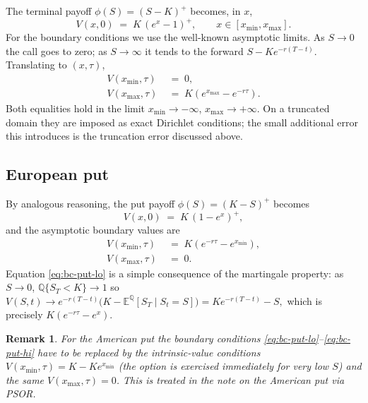 \documentclass[11pt,a4paper]{article}
\newtheorem{remark}[proposition]{Remark}
\begin{document}
The terminal payoff $\phi(S) = (S-K)^+$ becomes, in $x$,
\begin{equation}
V(x, 0) \;=\; K\,(e^x - 1)^+,
\qquad x \in [x_{\min}, x_{\max}].
\label{eq:ic-call}
\end{equation}
For the boundary conditions we use the well-known asymptotic limits.
As $S \to 0$ the call goes to zero; as $S \to \infty$ it tends to the
forward $S - K e^{-r(T-t)}$. Translating to $(x, \tau)$,
\begin{align}
V(x_{\min}, \tau) &\;=\; 0, \label{eq:bc-call-lo}\\
V(x_{\max}, \tau) &\;=\; K\!\left(e^{x_{\max}} - e^{-r\tau}\right).
\label{eq:bc-call-hi}
\end{align}
Both equalities hold in the limit $x_{\min}\to -\infty$,
$x_{\max} \to +\infty$. On a truncated domain they are imposed as
exact Dirichlet conditions; the small additional error this introduces
is the truncation error discussed above.

\subsection*{European put}

By analogous reasoning, the put payoff $\phi(S) = (K-S)^+$ becomes
\begin{equation}
V(x, 0) \;=\; K\,(1 - e^x)^+,
\label{eq:ic-put}
\end{equation}
and the asymptotic boundary values are
\begin{align}
V(x_{\min}, \tau) &\;=\; K\!\left(e^{-r\tau} - e^{x_{\min}}\right),
   \label{eq:bc-put-lo}\\
V(x_{\max}, \tau) &\;=\; 0.
   \label{eq:bc-put-hi}
\end{align}
Equation \eqref{eq:bc-put-lo} is a simple consequence of the
martingale property: as $S \to 0$, $\mathbb{Q}\{S_T < K\} \to 1$ so
\(
V(S,t) \to e^{-r(T-t)}\bigl(K - \mathbb{E}^{\mathbb{Q}}[S_T \mid S_t = S]\bigr)
= K e^{-r(T-t)} - S,
\)
which is precisely $K(e^{-r\tau} - e^x)$.

\begin{remark}
For the American put the boundary conditions
\eqref{eq:bc-put-lo}--\eqref{eq:bc-put-hi} have to be replaced by the
\emph{intrinsic-value} conditions $V(x_{\min},\tau) = K - K e^{x_{\min}}$
(the option is exercised immediately for very low $S$) and the same
$V(x_{\max},\tau) = 0$. This is treated in the note on the American
put via PSOR.
\end{remark}
\end{document}

